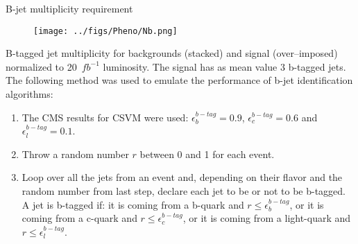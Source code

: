 \begin{frame}{B-jet multiplicity requirement}
\vspace{-.2cm}
\begin{figure}[!Hhtbp]
  \begin{center}
    \texttt{[image: ../figs/Pheno/Nb.png]}
  \end{center}
\end{figure}

\vspace{-.2cm}
    \begin{block}{}
      \tiny B-tagged jet multiplicity for backgrounds (stacked) and signal (over--imposed) normalized to 20~$fb^{-1}$ luminosity. The signal has as mean value 3 b-tagged jets. The following method was used to emulate the performance of b-jet identification algorithms:
  \begin{enumerate}\tiny
  \item The CMS results for CSVM were used: $\epsilon^{b-tag}_{b}=0.9$, $\epsilon^{b-tag}_{c}=0.6$ and $\epsilon^{b-tag}_{l}=0.1$.
  \item Throw a random number $r$ between 0 and 1 for each event.
  \item Loop over all the jets from an event and, depending on their flavor and the random number from last step, declare each jet to be or not to be b-tagged. A jet is b-tagged if: it is coming from a b-quark and $r\leq\epsilon^{b-tag}_{b}$, or it is coming from a c-quark and $r\leq\epsilon^{b-tag}_{c}$, or it is coming from a light-quark and $r\leq\epsilon^{b-tag}_{l}$.
  \end{enumerate}
    \end{block}

\end{frame}

\begin{frame}{}
\vspace{-.2cm}

\vspace{-.2cm}
    \begin{block}{}
      \tiny \centering 
    \end{block}

\end{frame}

\begin{frame}{}
\vspace{-.2cm}

\vspace{-.2cm}
    \begin{block}{}
      \tiny \centering 
    \end{block}

\end{frame}

